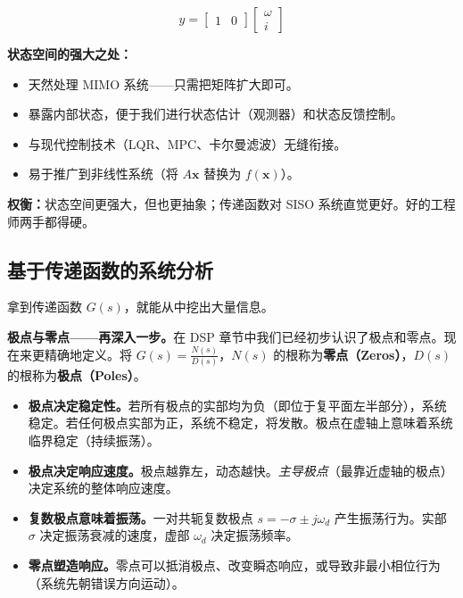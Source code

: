 \begin{equation}
y = \begin{bmatrix} 1 & 0 \end{bmatrix} \begin{bmatrix} \omega \\ i \end{bmatrix}
\end{equation}

\textbf{状态空间的强大之处：}
\begin{itemize}
    \item 天然处理 MIMO 系统——只需把矩阵扩大即可。
    \item 暴露内部状态，便于我们进行状态估计（观测器）和状态反馈控制。
    \item 与现代控制技术（LQR、MPC、卡尔曼滤波）无缝衔接。
    \item 易于推广到非线性系统（将 $A\mathbf{x}$ 替换为 $f(\mathbf{x})$）。
\end{itemize}

\textbf{权衡：}状态空间更强大，但也更抽象；传递函数对 SISO 系统直觉更好。好的工程师两手都得硬。

\subsection{基于传递函数的系统分析}
\label{sec:system_analysis_tf}

拿到传递函数 $G(s)$，就能从中挖出大量信息。

\textbf{极点与零点——再深入一步。}在 DSP 章节中我们已经初步认识了极点和零点。现在来更精确地定义。将 $G(s) = \frac{N(s)}{D(s)}$，$N(s)$ 的根称为\textbf{零点（Zeros）}，$D(s)$ 的根称为\textbf{极点（Poles）}。

\begin{itemize}
    \item \textbf{极点决定稳定性。}若所有极点的实部均为负（即位于复平面左半部分），系统稳定。若任何极点实部为正，系统不稳定，将发散。极点在虚轴上意味着系统临界稳定（持续振荡）。
    \item \textbf{极点决定响应速度。}极点越靠左，动态越快。\textit{主导极点}（最靠近虚轴的极点）决定系统的整体响应速度。
    \item \textbf{复数极点意味着振荡。}一对共轭复数极点 $s = -\sigma \pm j\omega_d$ 产生振荡行为。实部 $\sigma$ 决定振荡衰减的速度，虚部 $\omega_d$ 决定振荡频率。
    \item \textbf{零点塑造响应。}零点可以抵消极点、改变瞬态响应，或导致非最小相位行为（系统先朝错误方向运动）。
\end{itemize}

